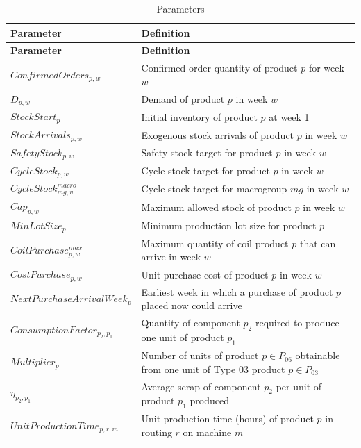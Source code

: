 \documentclass{article}
\begin{document}
\begin{longtable}{l p{8cm}}
\caption{Parameters} \label{tab:parameters} \\
\hline
\textbf{Parameter} & \textbf{Definition} \\
\hline
\endfirsthead
\hline
\textbf{Parameter} & \textbf{Definition} \\
\hline
\endhead
\hline
\endfoot
$ConfirmedOrders_{p,w}$ & Confirmed order quantity of product $p$ for week $w$ \\
$D_{p,w}$ & Demand of product $p$ in week $w$ \\
$StockStart_p$ & Initial inventory of product $p$ at week 1 \\
$StockArrivals_{p,w}$ & Exogenous stock arrivals of product $p$ in week $w$ \\
$SafetyStock_{p,w}$ & Safety stock target for product $p$ in week $w$ \\
$CycleStock_{p,w}$ & Cycle stock target for product $p$ in week $w$ \\
$CycleStock^{macro}_{mg,w}$ & Cycle stock target for macrogroup $mg$ in week $w$ \\
$Cap_{p,w}$ & Maximum allowed stock of product $p$ in week $w$ \\
$MinLotSize_p$ & Minimum production lot size for product $p$ \\
$CoilPurchase^{max}_{p,w}$ & Maximum quantity of coil product $p$ that can arrive in week $w$ \\
$CostPurchase_{p,w}$ & Unit purchase cost of product $p$ in week $w$ \\
$NextPurchaseArrivalWeek_p$ & Earliest week in which a purchase of product $p$ placed now could arrive \\
$ConsumptionFactor_{p_2,p_1}$ & Quantity of component $p_2$ required to produce one unit of product $p_1$ \\
$Multiplier_{p}$ & Number of units of product $p \in P_{06}$ obtainable from one unit of Type 03 product $p \in P_{03}$ \\
$\eta_{p_2,p_1}$ & Average scrap of component $p_2$ per unit of product $p_1$ produced \\
$UnitProductionTime_{p,r,m}$ & Unit production time (hours) of product $p$ in routing $r$ on machine $m$ \\

\end{longtable}
\end{document}
